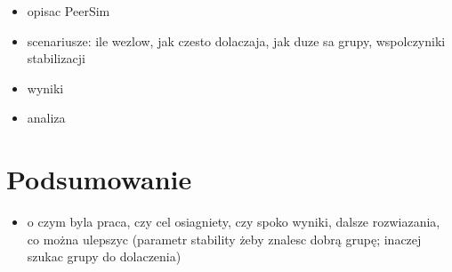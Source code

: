 \documentclass[12pt, twoside, openany]{report}
\begin{document}
\begin{itemize}
\item opisac PeerSim
\item scenariusze: ile wezlow, jak czesto dolaczaja, jak duze sa grupy, wspolczyniki stabilizacji
\item wyniki
\item analiza
\end{itemize}

\chapter{Podsumowanie}

\begin{itemize}
\item o czym byla praca, czy cel osiagniety, czy spoko wyniki, dalsze rozwiazania, co można ulepszyc (parametr stability żeby znalesc dobrą grupę; inaczej szukac grupy do dolaczenia)
\end{itemize}


\end{document}
